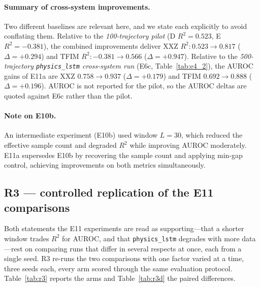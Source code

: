 \documentclass[twocolumn,10pt]{article}
\begin{document}
\paragraph{Summary of cross-system improvements.}
Two different baselines are relevant here, and we state each explicitly
to avoid conflating them.
Relative to the \emph{100-trajectory pilot} (D $R^2 = 0.523$,
E $R^2 = -0.381$), the combined improvements deliver
XXZ $R^2: 0.523 \to 0.817$ ($\Delta = +0.294$) and
TFIM $R^2: -0.381 \to 0.566$ ($\Delta = +0.947$).
Relative to the \emph{500-trajectory \texttt{physics\_lstm}
cross-system run} (E6c, Table~\ref{tab:e4_2}), the AUROC gains of E11a
are XXZ $0.758 \to 0.937$ ($\Delta = +0.179$) and TFIM
$0.692 \to 0.888$ ($\Delta = +0.196$).
AUROC is not reported for the pilot, so the AUROC deltas are quoted
against E6c rather than the pilot.

\paragraph{Note on E10b.}
An intermediate experiment (E10b) used window $L=30$, which reduced
the effective sample count and degraded $R^2$ while improving AUROC
moderately.
E11a supersedes E10b by recovering the sample count and applying
min-gap control, achieving improvements on both metrics simultaneously.

\subsection{R3 --- controlled replication of the E11 comparisons}
\label{sec:r3}

Both statements the E11 experiments are read as supporting---that a
shorter window trades $R^2$ for AUROC, and that \texttt{physics\_lstm}
degrades with more data---rest on comparing runs that differ in several
respects at once, each from a single seed.
R3 re-runs the two comparisons with one factor varied at a time, three
seeds each, every arm scored through the same evaluation protocol.
Table~\ref{tab:r3} reports the arms and Table~\ref{tab:r3d} the paired
differences.
\end{document}
